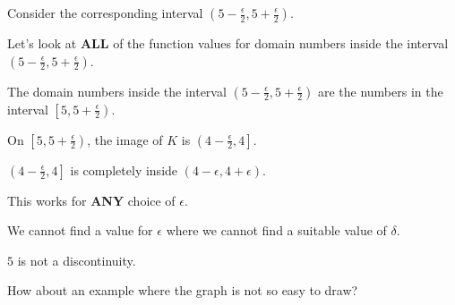 \documentclass{ximera}
\begin{document}
\begin{example}
Consider the corresponding interval $\left(5-\frac{\epsilon}{2} , 5+\frac{\epsilon}{2} \right)$.


Let's look at \textbf{ALL} of the function values for domain numbers inside the interval $\left(5-\frac{\epsilon}{2} , 5+\frac{\epsilon}{2} \right)$.

The domain numbers inside the interval $\left(5-\frac{\epsilon}{2} , 5+\frac{\epsilon}{2} \right)$ are the numbers in the interval $\left[5 , 5+\frac{\epsilon}{2} \right)$.

On $\left[5 , 5+\frac{\epsilon}{2} \right)$, the image of $K$ is $\left( 4-\frac{\epsilon}{2} ,4 \right]$.


$\left( 4-\frac{\epsilon}{2} ,4 \right]$ is completely inside $(4-\epsilon , 4+\epsilon)$. 


This works for \textbf{ANY} choice of $\epsilon$.

We cannot find a value for $\epsilon$ where we cannot find a suitable value of $\delta$.

$5$ is not a discontinuity.


\end{example}



















How about an example where the graph is not so easy to draw?
\end{document}
